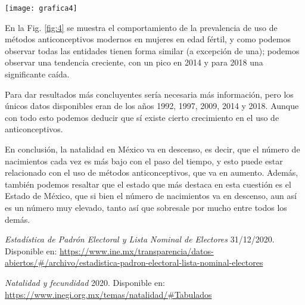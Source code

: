 \documentclass[11pt]{article}
\begin{document}
\begin{multicols}{2}
	\texttt{[image: grafica4]}\label{fig:4}
	
	En la  Fig. \ref{fig:4} se muestra el comportamiento de la prevalencia de uso de métodos anticonceptivos modernos en mujeres en edad fértil, y como podemos observar todas las entidades tienen forma similar (a excepción de una); podemos observar una tendencia creciente, con un pico en 2014 y para 2018 una significante caída. \par 
	Para dar resultados más concluyentes sería necesaria más información, pero los únicos datos disponibles eran de los años 1992, 1997, 2009, 2014 y 2018. Aunque con todo esto podemos deducir que sí existe cierto crecimiento en el uso de anticonceptivos.\par 
	En conclusión, la natalidad en México va en descenso, es decir, que el número de nacimientos cada vez es más bajo con el paso del tiempo, y esto puede estar relacionado con el uso de métodos anticonceptivos, que va en aumento. Además, también podemos resaltar que el estado que más destaca en esta cuestión es el Estado de México, que si bien el número de nacimientos va en descenso, aun así es un número muy elevado, tanto así que sobresale por mucho entre todos los demás.
	
	\begin{thebibliography}{9}
		\textit{Estadística de Padrón Electoral y Lista Nominal de Electores}
		31/12/2020. Disponible en:
		\url{https://www.ine.mx/transparencia/datos-abiertos/#/archivo/estadistica-padron-electoral-lista-nominal-electores}
		
		\textit{Natalidad y fecundidad}
		2020. Disponible en:
		\url{https://www.inegi.org.mx/temas/natalidad/#Tabulados}
	\end{thebibliography}
	
\end{multicols}

	
\end{document}

